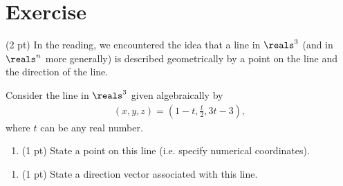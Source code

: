 \section{Exercise}

(2 pt) In the reading, we encountered the idea that a line in $\reals^{3}$ (and in $\reals^{n}$ more generally) is described geometrically by a point on the line and the direction of the line.

Consider the line in $\reals^{3}$ given algebraically by
\begin{align*}
(x,y,z)
=
\left(1 - t,\frac{t}{2},3 t - 3\right),
\end{align*}
where $t$ can be any real number.

\begin{enumerate}[label=(\alph*)]
\item (1 pt) State a point on this line (i.e. specify numerical coordinates).
\end{enumerate}

\spaceSolution{.5in}{}

\begin{enumerate}[resume,label=(\alph*)]
\item (1 pt) State a direction vector associated with this line.
\end{enumerate}

\spaceSolution{.5in}{}